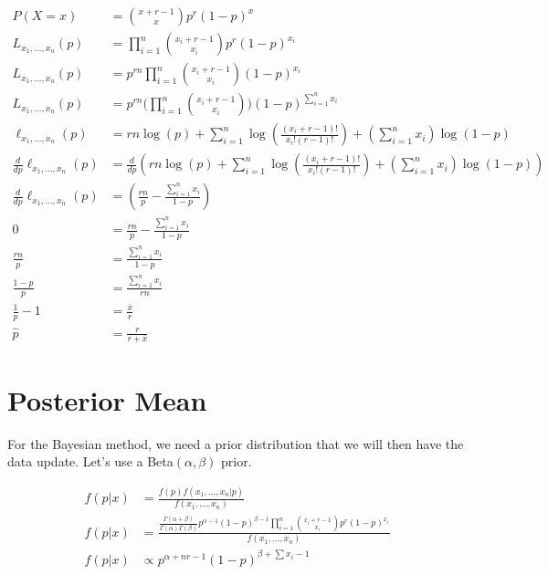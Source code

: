 \documentclass[
  letterpaper,
  DIV=11,
  numbers=noendperiod]{scrreprt}
\begin{document}
\[
\begin{aligned}
    P(X=x) &= \binom{x + r- 1}{x} p^r (1 - p)^x \\
    L_{x_1,...,x_n}(p) &= \prod_{i=1}^n \binom{x_i + r- 1}{x_i} p^r (1 - p)^{x_i} \\
    L_{x_1,...,x_n}(p) &= p^{rn} \prod_{i=1}^n \binom{x_i + r- 1}{x_i}  (1 - p)^{x_i} \\
    L_{x_1,...,x_n}(p) &= p^{rn} \Bigg(\prod_{i=1}^n \binom{x_i + r- 1}{x_i} \Bigg) (1 - p)^{\sum_{i=1}^n x_i} \\
    \ell_{x_1,...,x_n}(p) &= rn \log(p) + \sum_{i=1}^n \log \left(\frac{(x_i + r - 1)!}{{x_i}!(r - 1)!}\right) + \left(\sum_{i=1}^n x_i\right) \log(1 - p) \\
    \frac{d}{dp} \ell_{x_1,...,x_n}(p) &= \frac{d}{dp} \left( rn\log(p) + \sum_{i=1}^n \log \left(\frac{(x_i + r - 1)!}{{x_i}!(r - 1)!}\right) + \left(\sum_{i=1}^n x_i\right) \log(1 - p) \right) \\
    \frac{d}{dp} \ell_{x_1,...,x_n}(p) &= \left(\frac{rn}{p} - \frac{\sum_{i=1}^n x_i}{1 - p} \right) \\
    0 &= \frac{rn}{p} - \frac{\sum_{i=1}^n x_i}{1-p} \\
    \frac{rn}{p} &= \frac{\sum_{i=1}^n x_i}{1-p}  \\
    \frac{1-p}{p} &= \frac{\sum_{i=1}^n x_i}{rn} \\
    \frac{1}{p} - 1 &= \frac{\bar{x}}{r} \\
    \hat{p} &= \frac{r}{r + \bar{x}}
\end{aligned}
\]

\section{Posterior Mean}\label{posterior-mean}

For the Bayesian method, we need a prior distribution that we will then
have the data update. Let's use a Beta\((\alpha, \beta)\) prior.

\[
\begin{aligned}
    f(p | x) &= \frac{f(p)f(x_1,...,x_n|p)}{f(x_1,...,x_n)}  \\
    f(p | x) &= \frac{\frac{\Gamma(\alpha + \beta)}{\Gamma(\alpha)\Gamma(\beta)} p^{\alpha - 1} (1-p)^{\beta - 1} \prod_{i=1}^n \binom{x_i + r- 1}{x_i} p^r (1 - p)^{x_i}}{f(x_1,...,x_n)} \\ 
    f(p | x) &\propto p^{\alpha + nr - 1} (1-p)^{\beta + \sum x_i - 1}
\end{aligned}
\]
\end{document}
